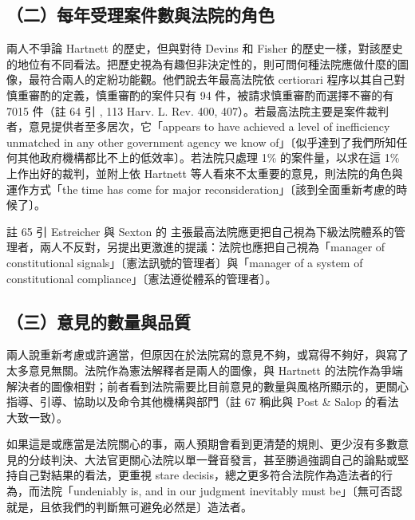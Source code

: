 \subsection{（二）每年受理案件數與法院的角色}

兩人不爭論 Hartnett 的歷史，但與對待 Devins 和 Fisher 的歷史一樣，對該歷史的地位有不同看法。把歷史視為有趣但非決定性的，則可問何種法院應做什麼的圖像，最符合兩人的定紛功能觀。他們說去年最高法院依 certiorari 程序以其自己對慎重審酌的定義，慎重審酌的案件只有 94 件，被請求慎重審酌而選擇不審的有 7015 件（註 64 引 , 113 Harv. L. Rev. 400, 407）。若最高法院主要是案件裁判者，意見提供者至多居次，它「appears to have achieved a level of inefficiency unmatched in any other government agency we know of」〔似乎達到了我們所知任何其他政府機構都比不上的低效率〕。若法院只處理 1\% 的案件量，以求在這 1\% 上作出好的裁判，並附上依 Hartnett 等人看來不太重要的意見，則法院的角色與運作方式「the time has come for major reconsideration」〔該到全面重新考慮的時候了〕。

註 65 引 Estreicher 與 Sexton 的  主張最高法院應更把自己視為下級法院體系的管理者，兩人不反對，另提出更激進的提議：法院也應把自己視為「manager of constitutional signals」〔憲法訊號的管理者〕與「manager of a system of constitutional compliance」〔憲法遵從體系的管理者〕。

\subsection{（三）意見的數量與品質}

兩人說重新考慮或許適當，但原因在於法院寫的意見不夠，或寫得不夠好，與寫了太多意見無關。法院作為憲法解釋者是兩人的圖像，與 Hartnett 的法院作為爭端解決者的圖像相對；前者看到法院需要比目前意見的數量與風格所顯示的，更關心指導、引導、協助以及命令其他機構與部門（註 67 稱此與 Post \& Salop 的看法大致一致）。

如果這是或應當是法院關心的事，兩人預期會看到更清楚的規則、更少沒有多數意見的分歧判決、大法官更關心法院以單一聲音發言，甚至勝過強調自己的論點或堅持自己對結果的看法，更重視 stare decisis，總之更多符合法院作為造法者的行為，而法院「undeniably is, and in our judgment inevitably must be」〔無可否認就是，且依我們的判斷無可避免必然是〕造法者。

